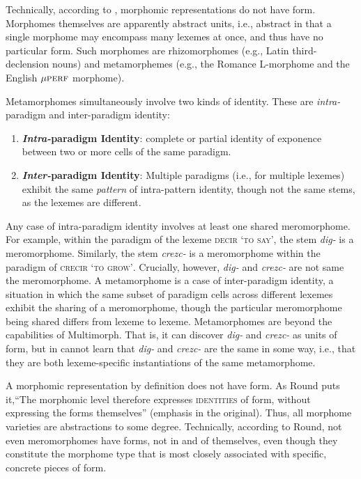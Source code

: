 	Technically, according to \cite{round:2011}, morphomic 
	representations do not have form. Morphomes
	themselves are apparently abstract units, i.e., abstract in that 
	a single morphome may encompass many lexemes at once, and thus
	have no particular form. Such morphomes are rhizomorphomes (e.g.,
	Latin third-declension nouns) and metamorphemes (e.g., the Romance L-morphome and the English
	${\mu}\textsc{perf}$ morphome).

	Metamorphomes simultaneously involve two kinds of identity. These are \emph{intra-}paradigm and {inter-}paradigm identity: 
	\begin{enumerate}
		\item \textbf{\emph{Intra-}paradigm Identity}: complete or partial identity of exponence between two or more cells of the same paradigm. 
		\item \textbf{\emph{Inter-}paradigm Identity}: Multiple paradigms (i.e., for multiple lexemes) exhibit the same \emph{pattern} of intra-pattern identity, though not the same stems, as the lexemes are different.
	\end{enumerate} 
Any case of intra-paradigm identity involves at least one shared 
meromorphome. For example, within the paradigm of the lexeme 
\textsc{decir} \textsc{`to say'}, 
the stem \textit{dig-} is a meromorphome. Similarly, the stem \textit{crezc-} 
is a meromorphome within the paradigm of 
\textsc{crecir} \textsc{`to grow'}. Crucially, however, 
\textit{dig-} and \textit{crezc-} are not same the meromorphome. 
A metamorphome is a case of inter-paradigm identity, a situation 
in which the same subset of paradigm cells across different lexemes 
exhibit the sharing of a meromorphome, 
though the particular meromorphome being shared differs from lexeme to 
lexeme. Metamorphomes are beyond the capabilities of Multimorph. 
That is, it can discover \textit{dig-} and \textit{crezc-} as units of form, 
but in cannot learn that \textit{dig-} and \textit{crezc-} are the same 
in some way, i.e., that they are both lexeme-specific instantiations of the
same metamorphome.

A morphomic representation by definition does not have form.
As Round puts it,``The morphomic level 
therefore expresses \textsc{identities} of form, without 
expressing the forms themselves'' \citep[][pp.220-221]{round:2011} (emphasis in the original).
Thus, all morphome varieties are abstractions to some degree. 
Technically, according to Round, not even 
meromorphomes have forms, not in and 
of themselves, even though they constitute the 
morphome type that is most closely associated with specific, concrete pieces of form. 

